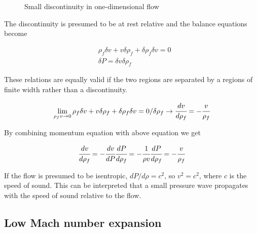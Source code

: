 \documentclass[a4paper,fleqn]{cas-dc}
\begin{document}
\begin{figure}[!h]
	\centering
	\caption{Small discontinuity in one-dimensional flow}
	\label{fig: Discontinuity_slow_flow}
\end{figure} 

The discontinuity is presumed to be at rest relative and the balance equations become		

{\footnotesize
	\begin{align*}
		&\rho_f \delta v + v \delta \rho_f + \delta \rho_f \delta v = 0 \\
		&\delta P = \delta v \delta \rho_f
	\end{align*}
}

These relations are equally valid if the two regions are separated by a regions of finite width rather than a discontinuity. 

{\footnotesize
	\begin{equation*}
		\lim_{\rho_f v \rightarrow 0} \rho_f \delta v + v \delta \rho_f + \delta \rho_f \delta v = 0 / \delta \rho_f \rightarrow \cfrac{d v}{d \rho_f} = - \cfrac{v}{\rho_f}
	\end{equation*}
}

By combining momentum equation with above equation we get

{\footnotesize
	\begin{equation*}
		\cfrac{d v}{d \rho_f} = - \cfrac{d v}{dP} \cfrac{d P}{d \rho_f} = -\cfrac{1}{\rho v} \cfrac{dP}{d\rho_f} = -\cfrac{v}{\rho_f}
	\end{equation*}
}

If the flow is presumed to be isentropic, $dP/d\rho = c^2$, so $v^2=c^2$, where $c$ is the speed of sound. This can be interpreted that a small pressure wave propagates with the speed of sound relative to the flow.

\subsection{Low Mach number expansion}
%

\end{document}
